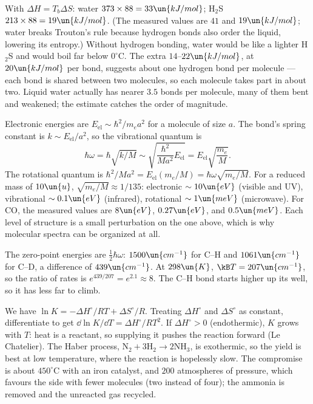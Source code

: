  With $\Delta H = T_b\Delta S$: water $373\times88 = 33\un{kJ/mol}$; H$_2$S $213\times88 = 19\un{kJ/mol}$. (The measured values are $41$ and $19\un{kJ/mol}$; water breaks Trouton's rule because hydrogen bonds also order the liquid, lowering its entropy.) Without hydrogen bonding, water would be like a lighter H$_2$S and would boil far below $0^\circ\text{C}$. The extra $14$--$22\un{kJ/mol}$, at $20\un{kJ/mol}$ per bond, suggests about one hydrogen bond per molecule --- each bond is shared between two molecules, so each molecule takes part in about two. Liquid water actually has nearer $3.5$ bonds per molecule, many of them bent and weakened; the estimate catches the order of magnitude.

 Electronic energies are $E_{\text{el}}\sim\hbar^2/m_ea^2$ for a molecule of size $a$. The bond's spring constant is $k\sim E_{\text{el}}/a^2$, so the vibrational quantum is
\[
  \hbar\omega = \hbar\sqrt{k/M}\sim\sqrt{\frac{\hbar^2}{Ma^2}E_{\text{el}}} = E_{\text{el}}\sqrt{\frac{m_e}{M}}.
\]
The rotational quantum is $\hbar^2/Ma^2 = E_{\text{el}}(m_e/M) = \hbar\omega\sqrt{m_e/M}$. For a reduced mass of $10\un{u}$, $\sqrt{m_e/M}\approx1/135$: electronic $\sim10\un{eV}$ (visible and UV), vibrational $\sim0.1\un{eV}$ (infrared), rotational $\sim1\un{meV}$ (microwave). For CO, the measured values are $8\un{eV}$, $0.27\un{eV}$, and $0.5\un{meV}$. Each level of structure is a small perturbation on the one above, which is why molecular spectra can be organized at all.

 The zero-point energies are $\tfrac12\hbar\omega$: $1500\un{cm^{-1}}$ for C--H and $1061\un{cm^{-1}}$ for C--D, a difference of $439\un{cm^{-1}}$. At $298\un{K}$, $\kB T = 207\un{cm^{-1}}$, so the ratio of rates is $e^{439/207} = e^{2.1}\approx8$. The C--H bond starts higher up its well, so it has less far to climb.

 We have $\ln K = -\Delta H^\circ/RT + \Delta S^\circ/R$. Treating $\Delta H^\circ$ and $\Delta S^\circ$ as constant, differentiate to get $\dd\ln K/\dd T = \Delta H^\circ/RT^2$. If $\Delta H^\circ>0$ (endothermic), $K$ grows with $T$: heat is a reactant, so supplying it pushes the reaction forward (Le Chatelier). The Haber process, $\mathrm N_2 + 3\mathrm H_2\to2\mathrm{NH_3}$, is exothermic, so the yield is best at low temperature, where the reaction is hopelessly slow. The compromise is about $450^\circ\text{C}$ with an iron catalyst, and $200$ atmospheres of pressure, which favours the side with fewer molecules (two instead of four); the ammonia is removed and the unreacted gas recycled.

